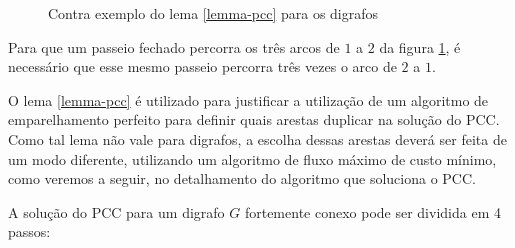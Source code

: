     \begin{figure}[h]
        \centering
        \caption{Contra exemplo do lema \ref{lemma-pcc} para os digrafos}
        \label{counter-lemma}
    \end{figure}

    Para que um passeio fechado percorra os três arcos de $1$ a $2$ da figura \ref{counter-lemma}, é necessário que esse mesmo passeio percorra três vezes o arco de $2$ a $1$.

    O lema \ref{lemma-pcc} é utilizado para justificar a utilização de um algoritmo de emparelhamento perfeito para definir quais arestas duplicar na solução do PCC.
    Como tal lema não vale para digrafos, a escolha dessas arestas deverá ser feita de um modo diferente, utilizando um algoritmo de fluxo máximo de custo mínimo, como veremos a seguir, no detalhamento do algoritmo que soluciona o PCC.

    A solução do PCC para um digrafo $G$ fortemente conexo pode ser dividida em 4 passos:

